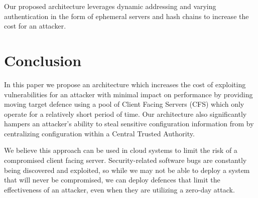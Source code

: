 \documentclass[a4paper,twoside]{article}
\begin{document}
Our proposed architecture leverages dynamic addressing and varying authentication in the form of ephemeral servers and hash chains to increase the cost for an attacker.


\section{Conclusion}

In this paper we propose an architecture which increases the cost of exploiting vulnerabilities  for an attacker with minimal impact on performance by providing moving target defence using a pool of Client Facing Servers (CFS) which only operate for a relatively short period of time. Our architecture also significantly hampers an attacker's ability to steal sensitive configuration information from by centralizing configuration within a Central Trusted Authority.

We believe this approach can be used in cloud systems to limit the risk of a compromised client facing server.  Security-related software bugs are constantly being discovered and exploited, so while we may not be able to deploy a system that will never be compromised, we can deploy defences that limit the effectiveness of an attacker, even when they are utilizing a zero-day attack.





%
%
\end{document}
